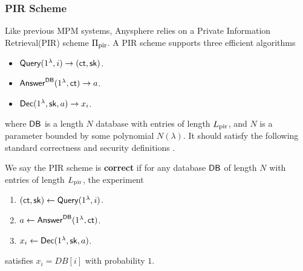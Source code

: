 \subsubsection{PIR Scheme}
\label{subsec:PIR}
Like previous MPM systems, Anysphere relies on a Private Information Retrieval(PIR) scheme $\Pi_{\text{pir}}$. A PIR scheme supports three efficient algorithms
\begin{itemize}
    \item $\mathsf{Query}(1^{\lambda}, i) \to (\mathsf{ct}, {\mathsf{sk}})$.
    \item $\mathsf{Answer}^{\mathsf{DB}}(1^{\lambda}, \mathsf{ct}) \to a$.
    \item $\mathsf{Dec}(1^{\lambda}, {\mathsf{sk}}, a) \to x_i$.
\end{itemize}
where $\mathsf{DB}$ is a length $N$ database with entries of length $L_{\text{pir}}$, and $N$ is a parameter bounded by some polynomial $N(\lambda)$. It should satisfy the following standard correctness and security definitions \cite{kushilevitz1997replication}.
\begin{definition}
\label{defn:PIR-correctness}
We say the PIR scheme is \textbf{correct} if for any database $\mathsf{DB}$ of length $N$ with entries of length $L_{\text{pir}}$, the experiment
\begin{enumerate}
    \item $(\mathsf{ct}, {\mathsf{sk}}) \leftarrow \mathsf{Query}(1^{\lambda}, i)$.
    \item $a \leftarrow \mathsf{Answer}^{\mathsf{DB}}(1^{\lambda}, \mathsf{ct})$.
    \item $x_i \leftarrow \mathsf{Dec}(1^{\lambda}, {\mathsf{sk}}, a)$.
\end{enumerate}
satisfies $x_i = DB[i]$ with probability $1$.
\end{definition}
